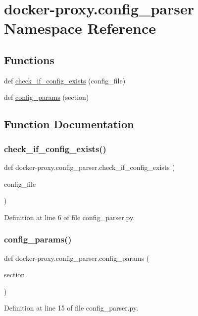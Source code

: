 \hypertarget{namespacedocker-proxy_1_1config__parser}{}\section{docker-\/proxy.config\+\_\+parser Namespace Reference}
\label{namespacedocker-proxy_1_1config__parser}
\subsection*{Functions}
\begin{DoxyCompactItemize}
\item 
def \hyperlink{namespacedocker-proxy_1_1config__parser_aa9dfa23e3cb83a9b109517727216624a}{check\+\_\+if\+\_\+config\+\_\+exists} (config\+\_\+file)
\item 
def \hyperlink{namespacedocker-proxy_1_1config__parser_a52b3461dc4ed5a410f566197208b4b13}{config\+\_\+params} (section)
\end{DoxyCompactItemize}


\subsection{Function Documentation}
\hypertarget{namespacedocker-proxy_1_1config__parser_aa9dfa23e3cb83a9b109517727216624a}{}\label{namespacedocker-proxy_1_1config__parser_aa9dfa23e3cb83a9b109517727216624a} 
\subsubsection{\texorpdfstring{check\+\_\+if\+\_\+config\+\_\+exists()}{check\_if\_config\_exists()}}
{\footnotesize\ttfamily def docker-\/proxy.\+config\+\_\+parser.\+check\+\_\+if\+\_\+config\+\_\+exists (\begin{DoxyParamCaption}\item[{}]{config\+\_\+file }\end{DoxyParamCaption})}



Definition at line 6 of file config\+\_\+parser.\+py.

\hypertarget{namespacedocker-proxy_1_1config__parser_a52b3461dc4ed5a410f566197208b4b13}{}\label{namespacedocker-proxy_1_1config__parser_a52b3461dc4ed5a410f566197208b4b13} 
\subsubsection{\texorpdfstring{config\+\_\+params()}{config\_params()}}
{\footnotesize\ttfamily def docker-\/proxy.\+config\+\_\+parser.\+config\+\_\+params (\begin{DoxyParamCaption}\item[{}]{section }\end{DoxyParamCaption})}



Definition at line 15 of file config\+\_\+parser.\+py.

